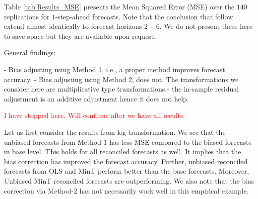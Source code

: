 \documentclass[12pt]{article}
\theoremstyle{definition}
\theoremstyle{property}
\begin{document}
\begin{table}
	\caption {Average {MSE($\times 10^3$)} of base and reconciled $1$-step-ahead point forecasts are presented for log transformation and Box-Cox transformation. Unbiased(Method-1) follows from the bias adjustment via Taylor's de-biasing factor whereas Unbiased(Method-2) follows from residual mean adjustment.}
	\label{tab:Results_MSE}
	\centering
	
\end{table}



Table \ref{tab:Results_MSE} presents the Mean Squared Error (MSE) over the $140$ replications for $1$-step-ahead forecasts. Note that the conclusion that follow extend almost identically to forecast horizons $2-6$. We do not present these here to save space but they are available upon request.

General findings:

- Bias adjusting using Method 1, i.e., a proper method improves forecast accuracy.
- Bias adjusting using Method 2, does not. The transformations we consider here are multiplicative type transformations - the in-sample residual adjustment is an additive adjustment hence it does not help.

\textcolor{red}{I have stopped here. Will continue after we have all results.}

Let us first consider the results from log transformation. We see that the unbiased forecasts from Method-1 has less MSE compared to the biased forecasts in base level. This holds for all reconciled forecasts as well. It implies that the bias correction has improved the forecast accuracy. Further, unbiased reconciled forecasts from OLS and MinT perform better than the base forecasts. Moreover, Unbiased MinT reconciled forecasts are outperforming.
We also note that the bias correction via Method-2 has not necessarily work well in this empirical example.
\end{document}

